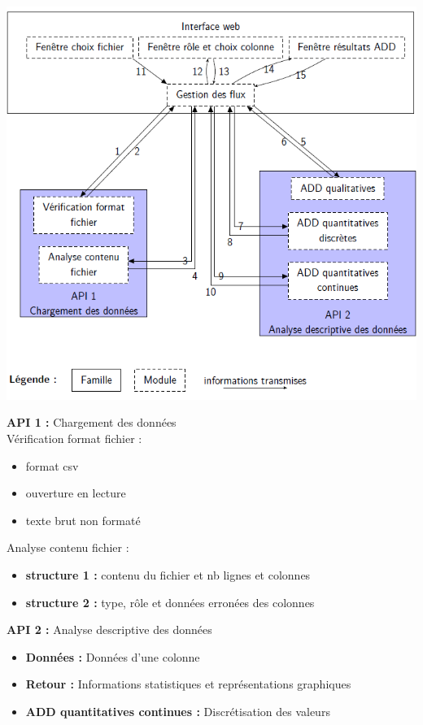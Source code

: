 	\begin{frame}
		\begin{center}\includegraphics[scale=0.43]{org.png}\end{center}
	\end{frame}
	
	\begin{frame}
		\textbf{API 1 :} Chargement des données\\
		Vérification format fichier :
		\begin{itemize}
			\item format csv
			\item ouverture en lecture
			\item texte brut non formaté
		\end{itemize}
		Analyse contenu fichier :
		\begin{itemize}
			\item \textbf{structure 1 :} contenu du fichier et nb lignes et colonnes
			\item \textbf{structure 2 :} type, rôle et données erronées des colonnes
		\end{itemize}
		
		\textbf{API 2 :} Analyse descriptive des données\\
		\begin{itemize}
			\item \textbf{Données :} Données d'une colonne
			\item \textbf{Retour :} Informations statistiques et représentations graphiques
			\item \textbf{ADD quantitatives continues :} Discrétisation des valeurs
		\end{itemize}	
	\end{frame}
	
